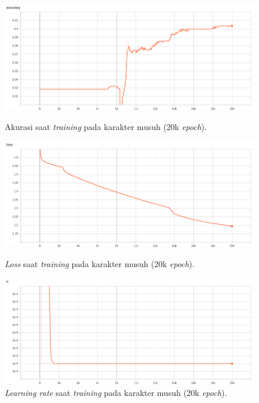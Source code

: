 \begin{figure} [!h] \centering
	\includegraphics[scale=0.44]{img/enemy_acc_chap4.png}
	\caption{Akurasi saat \textit{training} pada karakter musuh (20k \textit{epoch}).}
	\label{fig:nn_enemy_acc_chap4}
	\vspace{4ex}
	
	\includegraphics[scale=0.44]{img/enemy_loss_chap4.png}
	\caption{\textit{Loss} saat \textit{training} pada karakter musuh (20k \textit{epoch}).}
	\label{fig:nn_enemy_loss_chap4}
	\vspace{4ex}
	
	\includegraphics[scale=0.44]{img/enemy_lr_chap4.png}
	\caption{\textit{Learning rate} saat \textit{training} pada karakter musuh (20k \textit{epoch}).}
	\label{fig:nn_enemy_lr_chap4}
\end{figure}
\clearpage

